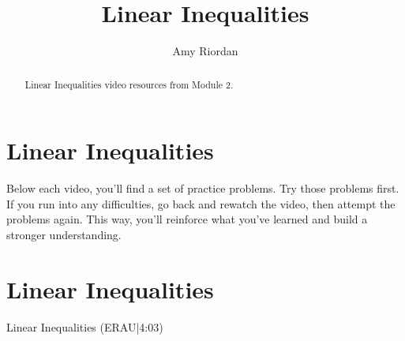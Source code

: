 \documentclass{ximera}
\title{Linear Inequalities}
\author{Amy Riordan}
\begin{document}
\begin{abstract}
Linear Inequalities video resources from Module 2.
\end{abstract}
\maketitle

\section*{Linear Inequalities}

Below each video, you’ll find a set of practice problems. Try those problems first. If you run into any difficulties, go back and rewatch the video, then attempt the problems again. This way, you’ll reinforce what you’ve learned and build a stronger understanding.

\section*{Linear Inequalities}

Linear Inequalities (ERAU|4:03)

\end{document}
